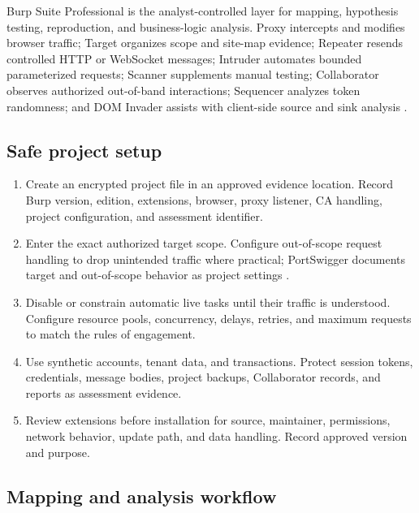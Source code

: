 \documentclass[11pt,letterpaper]{article}
\begin{document}
Burp Suite Professional is the analyst-controlled layer for mapping, hypothesis testing, reproduction, and business-logic analysis. Proxy intercepts and modifies browser traffic; Target organizes scope and site-map evidence; Repeater resends controlled HTTP or WebSocket messages; Intruder automates bounded parameterized requests; Scanner supplements manual testing; Collaborator observes authorized out-of-band interactions; Sequencer analyzes token randomness; and DOM Invader assists with client-side source and sink analysis \citep{burptools,burpproxy,burprepeater,burpintruder,burpcollaborator,burpsequencer,burpdom,burpscanner}.

\subsection{Safe project setup}

\begin{enumerate}
  \item Create an encrypted project file in an approved evidence location. Record Burp version, edition, extensions, browser, proxy listener, CA handling, project configuration, and assessment identifier.
  \item Enter the exact authorized target scope. Configure out-of-scope request handling to drop unintended traffic where practical; PortSwigger documents target and out-of-scope behavior as project settings \citep{burpscope}.
  \item Disable or constrain automatic live tasks until their traffic is understood. Configure resource pools, concurrency, delays, retries, and maximum requests to match the rules of engagement.
  \item Use synthetic accounts, tenant data, and transactions. Protect session tokens, credentials, message bodies, project backups, Collaborator records, and reports as assessment evidence.
  \item Review extensions before installation for source, maintainer, permissions, network behavior, update path, and data handling. Record approved version and purpose.
\end{enumerate}

\subsection{Mapping and analysis workflow}
\end{document}
